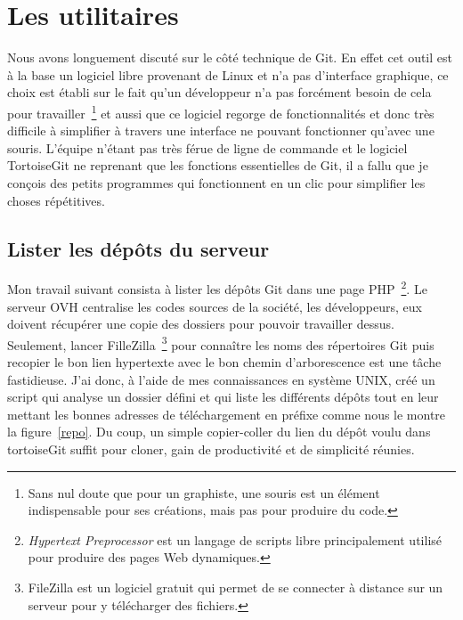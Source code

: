 \section{Les utilitaires} %
\label{sec:Les utilitaires}

Nous avons longuement discuté sur le côté technique de Git. En effet cet
outil est à la base un logiciel libre provenant de Linux et n'a pas
d'interface graphique, ce choix est établi sur le fait qu'un développeur
n'a pas forcément besoin de cela pour travailler\, \footnote{Sans nul
doute que pour un graphiste, une souris est un élément indispensable
pour ses créations, mais pas pour produire du code.} et aussi que ce
logiciel regorge de fonctionnalités et donc très difficile à simplifier
à travers une interface ne pouvant fonctionner qu'avec une souris.
L'équipe n'étant pas très férue de ligne de commande et le logiciel
TortoiseGit ne reprenant que les fonctions essentielles de Git, il a
fallu que je conçois des petits programmes qui fonctionnent en un clic
pour simplifier les choses répétitives.

\subsection{Lister les dépôts du serveur} %
\label{sub:Lister les dépôts du serveur}

Mon travail suivant consista à lister les dépôts Git dans une page
PHP\, \footnote{\emph{Hypertext Preprocessor} est un langage de scripts
libre principalement utilisé pour produire des pages Web dynamiques.}.
Le serveur OVH centralise les codes sources de la société, les
développeurs, eux doivent récupérer une copie des dossiers pour pouvoir
travailler dessus. Seulement, lancer FilleZilla\, \footnote{FileZilla
est un logiciel gratuit qui permet de se connecter à distance sur un
serveur pour y télécharger des fichiers.} pour connaître les noms des
répertoires Git puis recopier le bon lien hypertexte avec le bon chemin
d'arborescence est une tâche fastidieuse.  J'ai donc, à l'aide de mes
connaissances en système UNIX, créé un script qui analyse un dossier
défini et qui liste les différents dépôts tout en leur mettant les
bonnes adresses de téléchargement en préfixe comme nous le montre la
figure~\ref{repo}. Du coup, un simple copier-coller du lien du dépôt
voulu dans tortoiseGit suffit pour cloner, gain de productivité et de
simplicité réunies.

